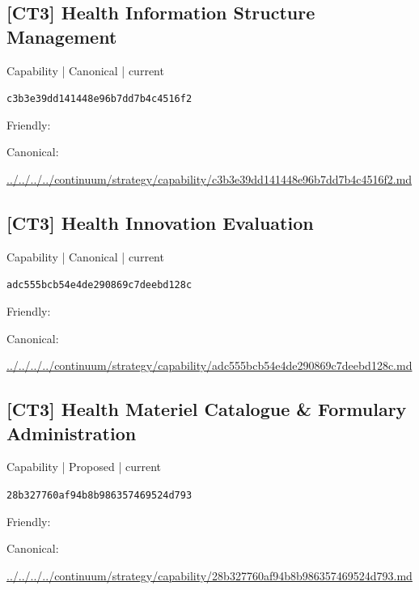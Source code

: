 \documentclass[10pt,a4paper]{article}
\begin{document}
\subsection*{[CT3] Health Information Structure Management}
{\small Capability | Canonical | current}\par
\texttt{c3b3e39dd141448e96b7dd7b4c4516f2}\par
Friendly: \par
Canonical: \par
{\footnotesize\url{../../../../continuum/strategy/capability/c3b3e39dd141448e96b7dd7b4c4516f2.md}}\par
\subsection*{[CT3] Health Innovation Evaluation}
{\small Capability | Canonical | current}\par
\texttt{adc555bcb54e4de290869c7deebd128c}\par
Friendly: \par
Canonical: \par
{\footnotesize\url{../../../../continuum/strategy/capability/adc555bcb54e4de290869c7deebd128c.md}}\par
\subsection*{[CT3] Health Materiel Catalogue \& Formulary Administration}
{\small Capability | Proposed | current}\par
\texttt{28b327760af94b8b986357469524d793}\par
Friendly: \par
Canonical: \par
{\footnotesize\url{../../../../continuum/strategy/capability/28b327760af94b8b986357469524d793.md}}\par
\end{document}
